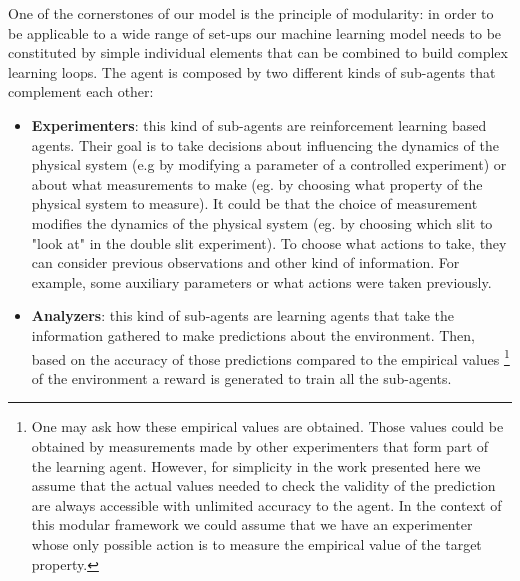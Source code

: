 \documentclass[11pt,a4paper,twoside]{report}
\newcommand{\+}{\textnormal{+} }
\theoremstyle{definition}
\numberwithin{equation}{chapter}
\begin{document}
One of the cornerstones of our model is the principle of modularity: in order to
be applicable to a wide range of set-ups our machine learning model needs to be
constituted by simple individual elements that can be combined to build complex
learning loops. The agent is composed by two different kinds of sub-agents that
complement each other:

\begin{itemize}
  \item \textbf{Experimenters}: this kind of sub-agents are reinforcement
  learning based agents. Their goal is to take decisions about influencing the
  dynamics of the physical system (e.g by modifying a parameter of a controlled
  experiment) or about what measurements to make (eg. by choosing what property
  of the physical system to measure). It could be that the choice of
  measurement modifies the dynamics of the physical system (eg. by choosing
  which slit to "look at" in the double slit experiment). To choose what actions
  to take, they can consider previous observations and other kind of
  information. For example, some auxiliary parameters or what actions were taken
  previously.
  \item \textbf{Analyzers}: this kind of sub-agents are learning agents that
  take the information gathered to make predictions about the environment. Then,
  based on the accuracy of those predictions compared to the empirical values
  \footnote{One may ask how these empirical values are obtained. Those values
  could be obtained by measurements made by other experimenters that form part
  of the learning agent. However, for simplicity in the work presented here we
  assume that the actual values needed to check the validity of the prediction
  are always accessible with unlimited accuracy to the agent. In the context of
  this modular framework we could assume that we have an experimenter whose
  only possible action is to measure the empirical value of the target
  property.} of the environment a reward is generated to train all the
  sub-agents. 

\end{itemize}
\end{document}
